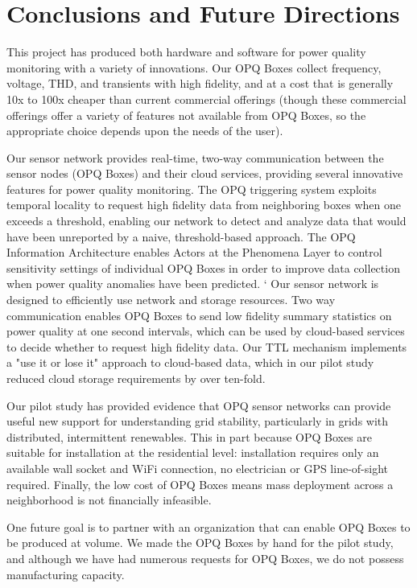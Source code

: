 \section{Conclusions and Future Directions}
\label{sec:conclusions}

This project has produced both hardware and software for power quality monitoring with a variety of innovations.  Our OPQ Boxes collect frequency, voltage, THD, and transients with high fidelity, and at a cost that is generally 10x to 100x cheaper than current commercial offerings (though these commercial offerings offer a variety of features not available from OPQ Boxes, so the appropriate choice depends upon the needs of the user).

Our sensor network provides real-time, two-way communication between the sensor nodes (OPQ Boxes) and their cloud services, providing several innovative features for power quality monitoring. The OPQ triggering system exploits temporal locality to request high fidelity data from neighboring boxes when one exceeds a threshold, enabling our network to detect and analyze data that would have been unreported by a naive, threshold-based approach. The OPQ Information Architecture enables Actors at the Phenomena Layer to control sensitivity settings of individual OPQ Boxes in order to improve data collection when power quality anomalies have been predicted.
`
Our sensor network is designed to efficiently use network and storage resources. Two way communication enables OPQ Boxes to send low fidelity summary statistics on power quality at one second intervals, which can be used by cloud-based services to decide whether to request high fidelity data.  Our TTL mechanism implements a "use it or lose it" approach to cloud-based data, which in our pilot study reduced cloud storage requirements by over ten-fold.

Our pilot study has provided evidence that OPQ sensor networks can provide useful new support for understanding grid stability, particularly in grids with distributed, intermittent renewables. This in part because OPQ Boxes are suitable for installation at the residential level: installation requires only an available wall socket and WiFi connection, no electrician or GPS line-of-sight required. Finally, the low cost of OPQ Boxes means mass deployment across a neighborhood is not financially infeasible.

One future goal is to partner with an organization that can enable OPQ Boxes to be produced at volume. We made the OPQ Boxes by hand for the pilot study, and although we have had numerous requests for OPQ Boxes, we do not possess manufacturing capacity.

